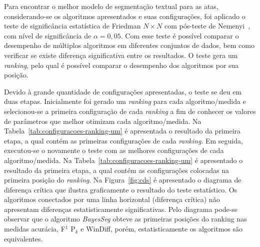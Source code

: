 



Para encontrar o melhor modelo de segmentação textual para as atas, considerando-se os algoritmos apresentados e suas configurações, foi aplicado o teste de significância estatística de Friedman $N \times N$ com pós-teste de Nemenyi~\cite{Bogdan2012, Garcia2010, Demsar2006}, com nível de significância de $\alpha = 0,05$. 
Com esse teste é possível comparar o desempenho de múltiplos algoritmos em diferentes conjuntos de dados, bem como verificar se existe diferença significativa entre os resultados. O teste gera um \textit{ranking}, pelo qual é possível comparar o desempenho dos algoritmos por sua posição.
%

Devido à grande quantidade de configurações apresentadas, o teste se deu em duas etapas.
% 
Inicialmente foi gerado um \textit{ranking} para cada algoritmo/medida e selecionou-se a primeira configuração de cada \textit{ranking} a fim de conhecer os valores de parâmetros que melhor otimizam cada algoritmo/medida. Na Tabela~\ref{tab:configuracoes-ranking-um} é apresentada o resultado da primeira etapa, a qual contém as primeiras configurações de cada \textit{ranking}.
Em seguida, executou-se o novamente o teste com as melhores configurações de cada algoritmo/medida.  Na Tabela~\ref{tab:configuracoes-ranking-um} é apresentado o resultado da primeira etapa, a qual contém as configurações colocadas na primeira posição do \textit{ranking}.
Na Figura~\ref{fig:cds} é apresentado o diagrama de diferença crítica que ilustra graficamente o resultado do teste estatístico. Os algoritmos conectados por uma linha horizontal (diferença crítica) não apresentam diferenças estatisticamente significativas.  Pelo diagrama pode-se observar que o algoritmo \textit{BayesSeg} obteve as primeiras posições do ranking nas medidas acurácia, F$^1$ P$_k$ e WinDiff, porém, estatisticamente os algoritmos são equivalentes.  %



